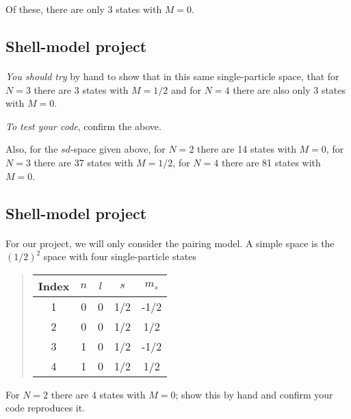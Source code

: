 \noindent
Of these, there are only 3 states with $M=0$.



\subsection*{Shell-model project}

\paragraph{}
\emph{You should try} by hand to show that in this same single-particle space, that for 
$N=3$ there are 3 states with $M=1/2$ and for $N= 4$ there are also only 3 states with $M=0$. 

\emph{To test your code}, confirm the above. 

Also, 
for the $sd$-space given above, for $N=2$ there are 14 states with $M=0$, for $N=3$ there are 37 
states with $M=1/2$, for $N=4$ there are 81 states with $M=0$.



\subsection*{Shell-model project}

\paragraph{}
For our project, we will only consider the pairing model.
A simple space is the $(1/2)^2$ space with four single-particle states


\begin{quote}
\begin{tabular}{ccccc}
\hline
\multicolumn{1}{c}{ Index } & \multicolumn{1}{c}{ $n$ } & \multicolumn{1}{c}{ $l$ } & \multicolumn{1}{c}{ $s$ } & \multicolumn{1}{c}{ $m_s$ } \\
\hline
1     & 0   & 0   & 1/2 & -1/2  \\
2     & 0   & 0   & 1/2 & 1/2   \\
3     & 1   & 0   & 1/2 & -1/2  \\
4     & 1   & 0   & 1/2 & 1/2   \\
\hline
\end{tabular}
\end{quote}

\noindent
For $N=2$ there are 4 states with $M=0$; show this by hand and confirm your code reproduces it.



